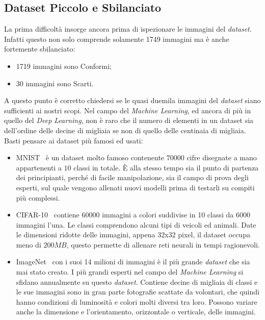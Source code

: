 \subsection{Dataset Piccolo e Sbilanciato}
La prima difficoltà insorge ancora prima di ispezionare le immagini del \textit{dataset}.
Infatti questo non solo comprende solamente 1749 immagini ma è anche fortemente sbilanciato:
\begin{itemize}
    \item 1719 immagini sono Conformi;
    \item 30 immagini sono Scarti.
\end{itemize}
A questo punto è corretto chiedersi se le quasi duemila immagini del \textit{dataset} siano sufficienti ai nostri scopi.
Nel campo del \textit{Machine Learning}, ed ancora di più in quello del \textit{Deep Learning}, non è raro che il numero di elementi in un dataset sia dell'ordine delle decine di migliaia se non di quello delle centinaia di migliaia.
Basti pensare ai dataset più famosi ed usati:
\begin{itemize}
  \item MNIST~\cite{mnist} è un dataset molto famoso contenente $70000$ cifre disegnate a mano appartenenti a $10$ classi in totale.
    È alla stesso tempo sia il punto di partenza dei principianti, perché di facile manipolazione, sia il campo di prova degli esperti, sul quale vengono allenati nuovi modelli prima di testarli su compiti più complessi.

  \item CIFAR-10~\cite{cifar} contiene $60000$ immagini a colori suddivise in 10 classi da 6000 immagini l'una.
    Le classi comprendono alcuni tipi di veicoli ed animali.
   Date le dimensioni ridotte delle immagini, appena $32$x$32$ pixel, il dataset occupa meno di $200 MB$, questo permette di allenare reti neurali in tempi ragionevoli.

 \item ImageNet~\cite{imagenet} con i suoi 14 milioni di immagini è il più grande \textit{dataset} che sia mai stato creato.
    I più grandi esperti nel campo del \textit{Machine Learning} si sfidano annualmente su questo \textit{dataset}.
    Contiene decine di migliaia di classi e le sue immagini sono in gran parte fotografie scattate da volontari, che quindi hanno condizioni di luminosità e colori molti diversi tra loro.
    Possono variare anche la dimensione e l'orientamento, orizzontale o verticale, delle immagini.

\end{itemize}

